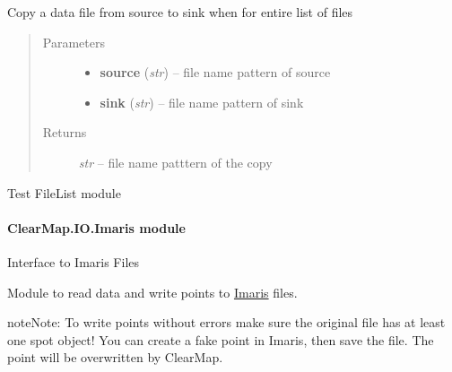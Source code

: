 \documentclass[letterpaper,10pt,english]{sphinxmanual}
\begin{document}

\begin{fulllineitems}
\label{api/ClearMap.IO:ClearMap.IO.FileList.copyData}
Copy a data file from source to sink when for entire list of files
\begin{quote}\begin{description}
\item[{Parameters}] \leavevmode\begin{itemize}
\item {} 
\textbf{source} (\emph{str}) --
file name pattern of source

\item {} 
\textbf{sink} (\emph{str}) --
file name pattern of sink

\end{itemize}

\item[{Returns}] \leavevmode
\emph{str} --
file name patttern of the copy

\end{description}\end{quote}

\end{fulllineitems}


\begin{fulllineitems}
\label{api/ClearMap.IO:ClearMap.IO.FileList.test}
Test FileList module

\end{fulllineitems}



\paragraph{ClearMap.IO.Imaris module}
\label{api/ClearMap.IO:clearmap-io-imaris-module}\label{api/ClearMap.IO:module-ClearMap.IO.Imaris}
Interface to Imaris Files

Module to read data and write points to \href{http://www.bitplane.com/imaris/imaris}{Imaris}
files.

\begin{notice}{note}{Note:}
To write points without errors make sure the original file has at least one spot object! You can create a fake point in Imaris, then save the file. The point will be overwritten by ClearMap.
\end{notice}
\end{document}
